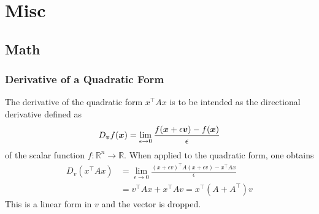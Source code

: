 \chapter{Misc}

\section{Math}

\subsection{Derivative of a Quadratic Form}
\label{sec:derivative-quadratic-form}

The derivative of the quadratic form $x^\top A x$ is to be intended as the directional derivative defined as
\begin{equation*}
  D_{\boldsymbol{v}} f(\boldsymbol{x}) = \lim_{\epsilon \rightarrow 0} \frac{f(\boldsymbol{x}+\epsilon\boldsymbol{v}) - f(\boldsymbol{x})}{\epsilon}
\end{equation*}
of the scalar function $f:\mathbb{R}^n\rightarrow \mathbb{R}$. When applied to the quadratic form, one obtains
\begin{equation}
  \label{eq:derivative-quadratic-form}
  \begin{aligned}
    D_v \left(x^\top A x\right) &= \lim_{\epsilon \rightarrow 0} \frac{(x+\epsilon v)^\top A(x+\epsilon v) - x^\top Ax}{\epsilon} \\
                                &= v^\top Ax + x^\top Av = x^\top\left(A + A^\top\right)v
  \end{aligned}
\end{equation}
This is a linear form in $v$ and the vector is dropped.

